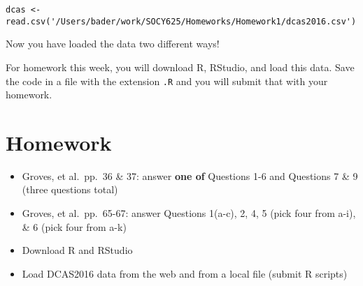 \documentclass[11pt]{lecturenotes}
\newcommand{\code}[1]{\texttt{#1}}
\begin{document}
\begin{verbatim}
dcas <- read.csv('/Users/bader/work/SOCY625/Homeworks/Homework1/dcas2016.csv')
\end{verbatim}

Now you have loaded the data two different ways!

For homework this week, you will download R, RStudio, and load this data. Save the code in a file with the extension \code{.R} and you will submit that with your homework. 

\section{Homework}
\begin{itemize}
\item Groves, et al.\ pp.\ 36 \& 37: answer \textbf{one of} Questions 1-6 and Questions 7 \& 9 (three questions total)
\item Groves, et al.\ pp.\ 65-67: answer  Questions 1(a-c), 2, 4, 5 (pick four from a-i), \& 6 (pick four from a-k)
\item Download R and RStudio
\item Load DCAS2016 data from the web and from a local file (submit R scripts)
\end{itemize}
\end{document}
